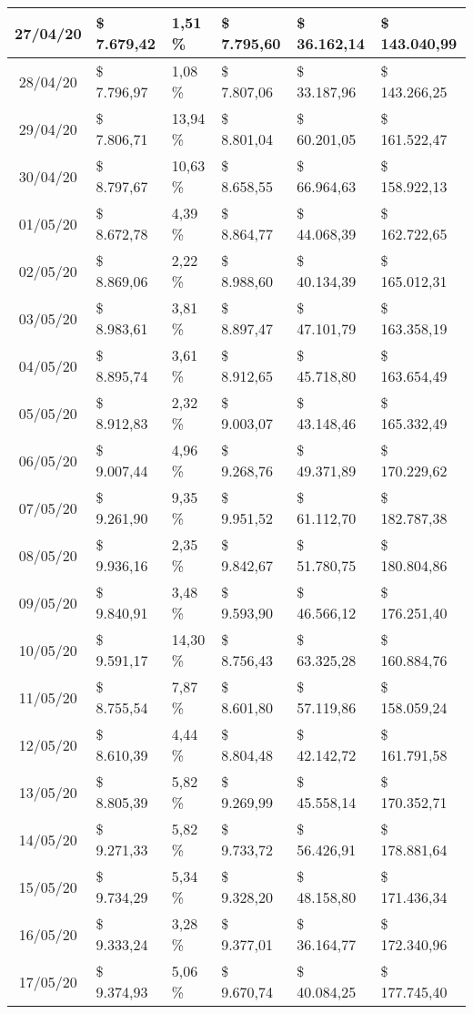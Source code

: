 \begin{small}
\begin{longtable}{|c|l|l|l|l|l|}
27/04/20 & \$ 7.679,42 & 1,51 \% & \$ 7.795,60 & \$ 36.162,14 & \$ 143.040,99 \\ \hline
28/04/20 & \$ 7.796,97 & 1,08 \% & \$ 7.807,06 & \$ 33.187,96 & \$ 143.266,25 \\ \hline
29/04/20 & \$ 7.806,71 & 13,94 \% & \$ 8.801,04 & \$ 60.201,05 & \$ 161.522,47 \\ \hline
30/04/20 & \$ 8.797,67 & 10,63 \% & \$ 8.658,55 & \$ 66.964,63 & \$ 158.922,13 \\ \hline
01/05/20 & \$ 8.672,78 & 4,39 \% & \$ 8.864,77 & \$ 44.068,39 & \$ 162.722,65 \\ \hline
02/05/20 & \$ 8.869,06 & 2,22 \% & \$ 8.988,60 & \$ 40.134,39 & \$ 165.012,31 \\ \hline
03/05/20 & \$ 8.983,61 & 3,81 \% & \$ 8.897,47 & \$ 47.101,79 & \$ 163.358,19 \\ \hline
04/05/20 & \$ 8.895,74 & 3,61 \% & \$ 8.912,65 & \$ 45.718,80 & \$ 163.654,49 \\ \hline
05/05/20 & \$ 8.912,83 & 2,32 \% & \$ 9.003,07 & \$ 43.148,46 & \$ 165.332,49 \\ \hline
06/05/20 & \$ 9.007,44 & 4,96 \% & \$ 9.268,76 & \$ 49.371,89 & \$ 170.229,62 \\ \hline
07/05/20 & \$ 9.261,90 & 9,35 \% & \$ 9.951,52 & \$ 61.112,70 & \$ 182.787,38 \\ \hline
08/05/20 & \$ 9.936,16 & 2,35 \% & \$ 9.842,67 & \$ 51.780,75 & \$ 180.804,86 \\ \hline
09/05/20 & \$ 9.840,91 & 3,48 \% & \$ 9.593,90 & \$ 46.566,12 & \$ 176.251,40 \\ \hline
10/05/20 & \$ 9.591,17 & 14,30 \% & \$ 8.756,43 & \$ 63.325,28 & \$ 160.884,76 \\ \hline
11/05/20 & \$ 8.755,54 & 7,87 \% & \$ 8.601,80 & \$ 57.119,86 & \$ 158.059,24 \\ \hline
12/05/20 & \$ 8.610,39 & 4,44 \% & \$ 8.804,48 & \$ 42.142,72 & \$ 161.791,58 \\ \hline
13/05/20 & \$ 8.805,39 & 5,82 \% & \$ 9.269,99 & \$ 45.558,14 & \$ 170.352,71 \\ \hline
14/05/20 & \$ 9.271,33 & 5,82 \% & \$ 9.733,72 & \$ 56.426,91 & \$ 178.881,64 \\ \hline
15/05/20 & \$ 9.734,29 & 5,34 \% & \$ 9.328,20 & \$ 48.158,80 & \$ 171.436,34 \\ \hline
16/05/20 & \$ 9.333,24 & 3,28 \% & \$ 9.377,01 & \$ 36.164,77 & \$ 172.340,96 \\ \hline
17/05/20 & \$ 9.374,93 & 5,06 \% & \$ 9.670,74 & \$ 40.084,25 & \$ 177.745,40 \\ \hline

\end{longtable}
\end{small}
